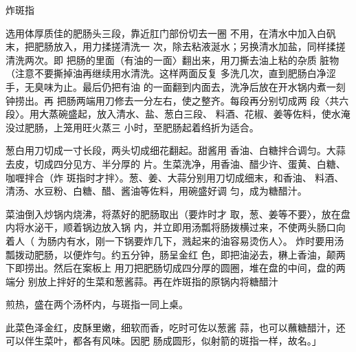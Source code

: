 \begin{recipe}{炸斑指}

\ingredients






\cooking

\step 选用体厚质佳的肥肠头三段，靠近肛门部份切去一圈 不用，在清水中加入白矾末，把肥肠放入，用力揉搓清洗一 次，除去粘液涎水；另换清水加盐，同样揉搓清洗两次。即 把肠的里面（有油的一面〉翻出来，用刀撕去油上粘的杂质 脏物（注意不要撕掉油再继续用水清洗。这样两面反复 多洗几次，直到肥肠白净涩手，无臭味为止。最后仍把有油 的一面翻到内面去，洗净后放在开水锅内煮一刻钟捞出。再 把肠两端用刀修去一分左右，使之整齐。每段再分别切成两 段〈共六段〉。用大蒸碗盛起，放入清水、盐、葱白三段、 料酒、花椒、姜等佐料，使水淹没过肥肠，上笼用旺火蒸三 小时，至肥肠起着绉折为适合。

\step 葱白用刀切成一寸长段，两头切成细花翻起。甜酱用 香油、白糖拌合调匀。大蒜去皮，切成四分见方、半分厚的 片。生菜洗净，用香油、醋少许、蛋黄、白糖、咖喱拌合（炸 斑指时才拌〉。葱、姜、大蒜分别用刀切成细末，和香油、 料酒、清汤、水豆粉、白糖、醋、酱油等佐料，用碗盛好调 匀，成为糖醋汁。

\step 菜油倒入炒锅内烧沸，将蒸好的肥肠取出（要炸时才 取，葱、姜等不要〉，放在盘内将水泌干，顺着锅边放入锅 内，并立即用汤瓢将肠拨横过来，不使两头肠口向着人（ 为肠内有水，刚一下锅要炸几下，溅起来的油容易烫伤人〉。 炸时要用汤瓢拨动肥肠，以便炸勻。约五分钟，肠呈金红 色，即把油泌去，楙上香油，颠两下即捞出。然后在案板上 用刀把肥肠切成四分厚的圆圈，堆在盘的中间，盘的两端分 别放上拌好的生菜和葱酱蒜。再在炸斑指的原锅内将糖醋汁

煎热，盛在两个汤杯内，与斑指一同上桌。

\notes

此菜色泽金红，皮酥里嫩，细软而香，吃时可佐以葱酱 蒜，也可以蘸糖醋汁，还可以伴生菜叶，都各有风味。因肥 肠成圆形，似射箭的斑指一样，故名。」

\end{recipe}

